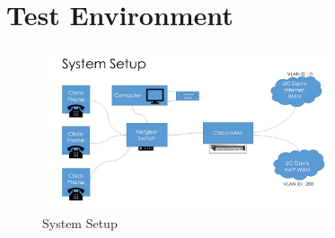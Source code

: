 \section {Test Environment}

\begin{figure}[h]
\begin{center}
\includegraphics[width=0.75\textwidth]{sys-setup.jpg}
\caption{System Setup}
\end{center}
\end{figure}